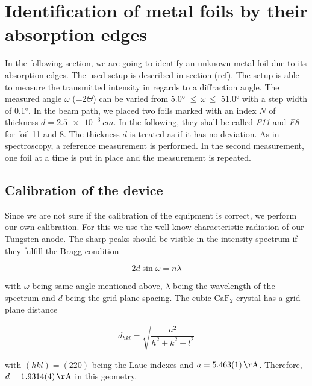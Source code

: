 \section{Identification of metal foils by their absorption edges}
\label{sec:absorb}

In the following section, we are going to identify an unknown metal foil due to its absorption edges. The used setup is described in section (ref).
The setup is able to measure the transmitted intensity in regards to a diffraction angle. The measured angle $\omega$ (=$2\Theta$) can be varied from 
5.0° $\leqslant \, \omega \, \leqslant$ 51.0° with a step width of 0.1°. In the beam path, we placed two foils marked with an index $N$ of thickness $d = \SI{2.5e-3}{cm}$. In the following, they shall be called \textit{F11} and \textit{F8} for foil 11 and 8.
The thickness $d$ is treated as if it has no deviation. As in spectroscopy, a reference measurement is performed. In the 
second measurement, one foil at a time is put in place and the measurement is repeated. 

\subsection[Calibration]{Calibration of the device}

Since we are not sure if the calibration of the equipment is correct, we perform our own calibration.
For this we use the well know characteristic radiation of our Tungsten anode. The sharp peaks should be visible in the 
intensity spectrum if they fulfill the Bragg condition

\begin{equation}
    2 d \sin{\omega} = n \lambda
\end{equation}

with $\omega$ being same angle mentioned above, $ \lambda $ being the wavelength of the spectrum and $d$ being the grid plane spacing. The cubic $\mathrm{CaF}_2$ crystal has a 
grid plane distance 

\begin{equation}
    d_{hkl} = \sqrt{\frac{a^2}{h^2+k^2+l^2}}
\end{equation}

with $(hkl) = (220) $ being the Laue indexes and $a = \SI{5.463 \pm 0.001 }{\AA}$. Therefore, $d = \SI{1.9314 \pm 0.0004}{\AA} $ in this geometry.

